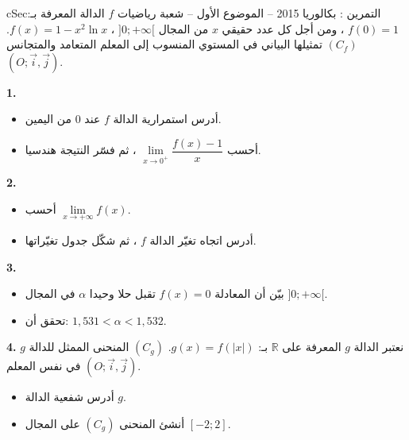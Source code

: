 \documentclass[12pt,a4paper]{article}
\newenvironment{BOX}[2]{\begin{otherlanguage}{english}\begin{arbox}{#1}{#2}}{\end{arbox}\end{otherlanguage}}
\newcounter{exo}
\newenvironment{tamrin}[1]{\stepcounter{exo}\begin{BOX}{cSec}{التمرين \theexo: #1}}{\end{BOX}}
\newcommand{\R}{\mathbb{R}}
\newenvironment{sq}{\begin{itemize}[leftmargin=2.4em,itemsep=3pt]}{\end{itemize}}
\newcommand{\qa}{\item[(أ)]}\newcommand{\qb}{\item[(ب)]}\newcommand{\qc}{\item[(جـ)]}\newcommand{\qd}{\item[(د)]}\newcommand{\qe}{\item[(هـ)]}
\newcommand{\QQ}[1]{\par\smallskip\textbf{#1.} }
\begin{document}
\begin{tamrin}{بكالوريا 2015 -- الموضوع الأول -- شعبة رياضيات}
$f$ الدالة المعرفة بـ: $f(0)=1$ ، ومن أجل كل عدد حقيقي $x$ من المجال $]0;+\infty[$ ، $f(x)=1-x^2\ln x$.
$(C_f)$ تمثيلها البياني في المستوي المنسوب إلى المعلم المتعامد والمتجانس $(O;\vec i,\vec j)$.
\QQ{1}
\begin{sq}
\qa أدرس استمرارية الدالة $f$ عند $0$ من اليمين.
\qb أحسب $\lim\limits_{x\to0^{+}}\dfrac{f(x)-1}{x}$ ، ثم فسّر النتيجة هندسيا.
\end{sq}
\QQ{2}
\begin{sq}
\qa أحسب $\lim\limits_{x\to+\infty}f(x)$.
\qb أدرس اتجاه تغيّر الدالة $f$ ، ثم شكّل جدول تغيّراتها.
\end{sq}
\QQ{3}
\begin{sq}
\qa بيّن أن المعادلة $f(x)=0$ تقبل حلا وحيدا $\alpha$ في المجال $]0;+\infty[$.
\qb تحقق أن: $1{,}531<\alpha<1{,}532$.
\end{sq}
\QQ{4} نعتبر الدالة $g$ المعرفة على $\R$ بـ: $g(x)=f(|x|)$. $(C_g)$ المنحنى الممثل للدالة $g$ في نفس المعلم $(O;\vec i,\vec j)$.
\begin{sq}
\qa أدرس شفعية الدالة $g$.
\qb أنشئ المنحنى $(C_g)$ على المجال $[-2;2]$.
\end{sq}
\end{tamrin}
\end{document}
